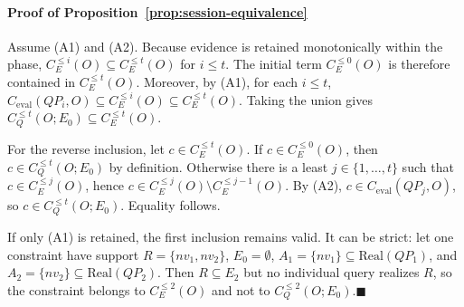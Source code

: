 \paragraph*{Proof of Proposition~\ref{prop:session-equivalence}}
Assume (A1) and (A2). Because evidence is retained monotonically within the phase, $C_E^{\le i}(O)\subseteq C_E^{\le t}(O)$ for $i\le t$. The initial term $C_E^{\le0}(O)$ is therefore contained in $C_E^{\le t}(O)$. Moreover, by (A1), for each $i\le t$, $C_{\mathrm{eval}}(QP_i,O)\subseteq C_E^{\le i}(O)\subseteq C_E^{\le t}(O)$. Taking the union gives $C_Q^{\le t}(O;E_0)\subseteq C_E^{\le t}(O)$.

For the reverse inclusion, let $c\in C_E^{\le t}(O)$. If $c\in C_E^{\le0}(O)$, then $c\in C_Q^{\le t}(O;E_0)$ by definition. Otherwise there is a least $j\in\{1,\ldots,t\}$ such that $c\in C_E^{\le j}(O)$, hence $c\in C_E^{\le j}(O)\setminus C_E^{\le j-1}(O)$. By (A2), $c\in C_{\mathrm{eval}}(QP_j,O)$, so $c\in C_Q^{\le t}(O;E_0)$. Equality follows.

If only (A1) is retained, the first inclusion remains valid. It can be strict: let one constraint have support $R=\{nv_1,nv_2\}$, $E_0=\emptyset$, $A_1=\{nv_1\}\subseteq\mathrm{Real}(QP_1)$, and $A_2=\{nv_2\}\subseteq\mathrm{Real}(QP_2)$. Then $R\subseteq E_2$ but no individual query realizes $R$, so the constraint belongs to $C_E^{\le2}(O)$ and not to $C_Q^{\le2}(O;E_0)$.\unskip\nobreak\hspace{0.5em}$\blacksquare$
